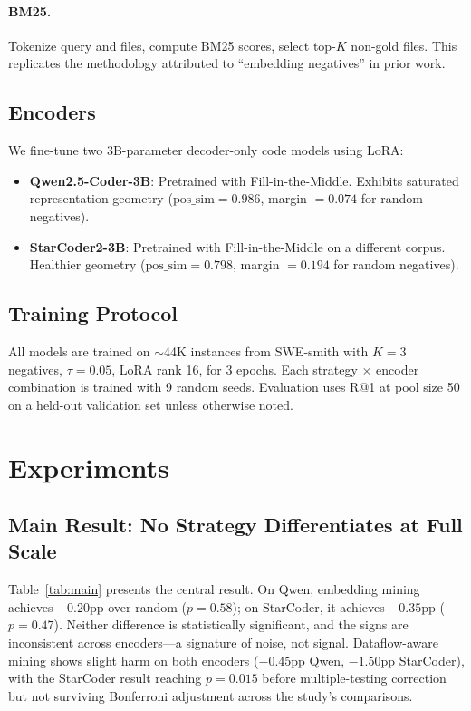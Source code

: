 \documentclass[11pt,a4paper]{article}
\begin{document}
\paragraph{BM25.} Tokenize query and files, compute BM25 scores, select top-$K$ non-gold files. This replicates the methodology attributed to ``embedding negatives'' in prior work.

\subsection{Encoders}

We fine-tune two 3B-parameter decoder-only code models using LoRA:

\begin{itemize}
    \item \textbf{Qwen2.5-Coder-3B}: Pretrained with Fill-in-the-Middle. Exhibits saturated representation geometry ($\text{pos\_sim}=0.986$, margin $= 0.074$ for random negatives).
    \item \textbf{StarCoder2-3B}: Pretrained with Fill-in-the-Middle on a different corpus. Healthier geometry ($\text{pos\_sim}=0.798$, margin $= 0.194$ for random negatives).
\end{itemize}

\subsection{Training Protocol}

All models are trained on $\sim$44K instances from SWE-smith with $K=3$ negatives, $\tau=0.05$, LoRA rank 16, for 3 epochs.
Each strategy $\times$ encoder combination is trained with 9 random seeds.
Evaluation uses R@1 at pool size 50 on a held-out validation set unless otherwise noted.

\section{Experiments}
\label{sec:experiments}

\subsection{Main Result: No Strategy Differentiates at Full Scale}
\label{sec:main_result}

Table~\ref{tab:main} presents the central result.
On Qwen, embedding mining achieves $+0.20$pp over random ($p=0.58$); on StarCoder, it achieves $-0.35$pp ($p=0.47$).
Neither difference is statistically significant, and the signs are inconsistent across encoders---a signature of noise, not signal.
Dataflow-aware mining shows slight harm on both encoders ($-0.45$pp Qwen, $-1.50$pp StarCoder), with the StarCoder result reaching $p=0.015$ before multiple-testing correction but not surviving Bonferroni adjustment across the study's comparisons.
\end{document}
